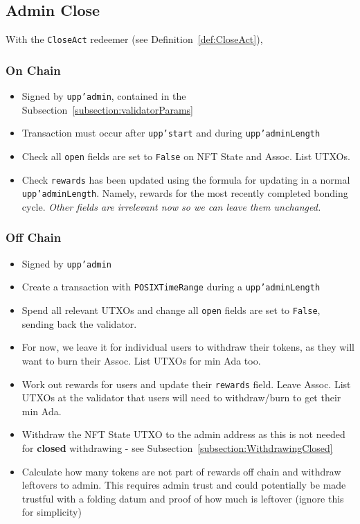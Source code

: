 \documentclass[10pt, a4paper]{article}
\theoremstyle{definition}
\begin{document}
\subsection{Admin Close}
With the \texttt{CloseAct} redeemer (see Definition~\ref{def:CloseAct}), 

\subsubsection{On Chain}
\begin{itemize}
\item{Signed by \texttt{upp'admin}, contained in the Subsection~\ref{subsection:validatorParams}}
\item{Transaction must occur after \texttt{upp'start} and during \texttt{upp'adminLength}}
\item{Check all \texttt{open} fields are set to \texttt{False} on NFT State and Assoc. List UTXOs.}
\item{Check \texttt{rewards} has been updated using the formula for updating in a normal \texttt{upp'adminLength}. Namely, rewards for the most recently completed bonding cycle.}
\textit{Other fields are irrelevant now so we can leave them unchanged.}
\end{itemize}

\subsubsection{Off Chain}
\begin{itemize}
\item{Signed by \texttt{upp'admin}}
\item{Create a transaction with \texttt{POSIXTimeRange} during a \texttt{upp'adminLength}}
\item{Spend all relevant UTXOs and change all \texttt{open} fields are set to \texttt{False}, sending back the validator.}
\item{For now, we leave it for individual users to withdraw their tokens, as they will want to burn their Assoc. List UTXOs for min Ada too.}
\item{Work out rewards for users and update their \texttt{rewards} field. Leave Assoc. List UTXOs at the validator that users will need to withdraw/burn to get their min Ada.}
\item{Withdraw the NFT State UTXO to the admin address as this is not needed for \textbf{closed} withdrawing - see Subsection~\ref{subsection:WithdrawingClosed}}
\item{Calculate how many tokens are not part of rewards off chain and withdraw leftovers to admin. This requires admin trust and could potentially be made trustful with a folding datum and proof of how much is leftover (ignore this for simplicity)}
\end{itemize}
\end{document}
